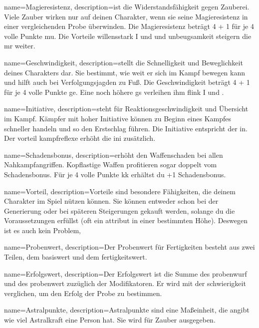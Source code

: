 {
    name={Magieresistenz},
    description={ist die Widerstandsfähigkeit gegen Zauberei. Viele Zauber wirken nur auf deinen Charakter, wenn sie seine Magieresistenz in einer vergleichenden Probe überwinden. Die Magieresistenz beträgt 4 + 1 für je 4 volle Punkte \gls{mu}. Die Vorteile \gls{willensstark I} und  und \gls{unbeugsamkeit} steigern die \gls{mr} weiter.}}

{
    name={Geschwindigkeit},
    description={stellt die Schnelligkeit und Beweglichkeit deines Charakters dar. Sie bestimmt, wie weit er sich im Kampf bewegen kann und hilft auch bei Verfolgungsjagden zu Fuß. Die Geschwindigkeit beträgt 4 + 1 für je 4 volle Punkte \gls{ge}. Eine noch höhere \gls{gs} verleihen ihm \gls{flink I} und .}}

{
    name={Initiative},
    description={steht für Reaktionsgeschwindigkeit und Übersicht im Kampf. Kämpfer mit hoher Initiative können zu Beginn eines Kampfes schneller handeln und so den Erstschlag führen. Die Initiative entspricht der \gls{in}. Der \gls{vorteil} \gls{kampfreflexe} erhöht die \gls{ini} zusätzlich.}}

{
    name={Schadensbonus},
    description={erhöht den Waffenschaden bei allen Nahkampfangriffen. Kopflastige Waffen profitieren sogar doppelt vom Schadensbonus. Für je 4 volle Punkte \gls{kk} erhältst du +1 Schadensbonus.}}

{
    name={Vorteil},
    description={Vorteile sind besondere Fähigkeiten, die deinem Charakter im Spiel nützen können. Sie können entweder schon bei der Generierung oder bei späteren Steigerungen gekauft werden, solange du die Voraussetzungen erfüllst (oft ein \gls{attribut} in einer bestimmten Höhe). Deswegen ist es auch kein Problem,}}

{
    name={Probenwert},
    description={Der Probenwert für Fertigkeiten besteht aus zwei Teilen, dem \gls{basiswert} und dem \gls{fertigkeitswert}.}}

{
    name={Erfolgswert},
    description={Der Erfolgswert ist die Summe des \gls{probenwurf} und des \gls{probenwert} zuzüglich der Modifikatoren. Er wird mit der \gls{schwierigkeit} verglichen, um den Erfolg der Probe zu bestimmen.}}

{
    name={Astralpunkte},
    description={Astralpunkte sind eine Maßeinheit, die angibt wie viel Astralkraft eine Person hat. Sie wird für Zauber ausgegeben.}}

